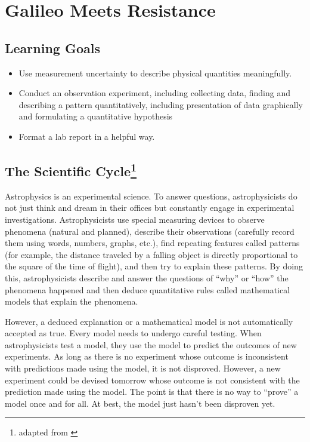 \chapter{Galileo Meets Resistance}

\section*{Learning Goals}
 \begin{itemize}
  \item Use measurement uncertainty to describe physical quantities meaningfully.
  
  \item Conduct an observation experiment, including collecting data, finding and describing a pattern quantitatively, including presentation of data graphically and formulating a quantitative hypothesis
  
  \item Format a lab report in a helpful way.
 \end{itemize}

\section*{The Scientific Cycle\protect\footnote{adapted from \cite{etkina_college_2014}}}

Astrophysics is an experimental science. To answer questions, astrophysicists do not just think and dream in their offices but constantly engage in experimental investigations. Astrophysicists use special measuring devices to observe phenomena (natural and planned), describe their observations (carefully record them using words, numbers, graphs, etc.), find repeating features called patterns (for example, the distance traveled by a falling object is directly proportional to the square of the time of flight), and then try to explain these patterns. By doing this, astrophysicists describe and answer the questions of ``why'' or ``how'' the phenomena happened and then deduce quantitative rules called mathematical models that explain the phenomena.

However, a deduced explanation or a mathematical model is not automatically accepted as true. Every model needs to undergo careful testing. When astrophysicists test a model, they use the model to predict the outcomes of new experiments. As long as there is no experiment whose outcome is inconsistent with predictions made using the model, it is not disproved. However, a new experiment could be devised tomorrow whose outcome is not consistent with the prediction made using the model. The point is that there is no way to ``prove'' a model once and for all. At best, the model just hasn't been disproven yet.

